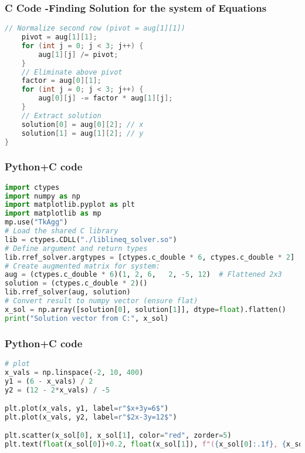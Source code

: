 \documentclass{beamer}
\begin{document}
\begin{frame}[fragile]
    \frametitle{C Code -Finding Solution for the system of Equations}

    \begin{lstlisting}[language=C]
    // Normalize second row (pivot = aug[1][1])
    pivot = aug[1][1];
    for (int j = 0; j < 3; j++) {
        aug[1][j] /= pivot;
    }
    // Eliminate above pivot
    factor = aug[0][1];
    for (int j = 0; j < 3; j++) {
        aug[0][j] -= factor * aug[1][j];
    }
    // Extract solution
    solution[0] = aug[0][2]; // x
    solution[1] = aug[1][2]; // y
}


    \end{lstlisting}
\end{frame}

\begin{frame}[fragile]
    \frametitle{Python+C code}

    \begin{lstlisting}[language=Python]
import ctypes
import numpy as np
import matplotlib.pyplot as plt
import matplotlib as mp
mp.use("TkAgg")
# Load the shared C library
lib = ctypes.CDLL("./liblineq_solver.so")
# Define argument and return types
lib.rref_solver.argtypes = [ctypes.c_double * 6, ctypes.c_double * 2]
# Create augmented matrix for system:
aug = (ctypes.c_double * 6)(1, 2, 6,   2, -5, 12)  # Flattened 2x3
solution = (ctypes.c_double * 2)()
lib.rref_solver(aug, solution)
# Convert result to numpy vector (ensure flat)
x_sol = np.array([solution[0], solution[1]], dtype=float).flatten()
print("Solution vector from C:", x_sol)


    \end{lstlisting}
\end{frame}

\begin{frame}[fragile]
    \frametitle{Python+C code}

    \begin{lstlisting}[language=Python]
# plot
x_vals = np.linspace(-2, 10, 400)
y1 = (6 - x_vals) / 2
y2 = (12 - 2*x_vals) / -5

plt.plot(x_vals, y1, label=r"$x+3y=6$")
plt.plot(x_vals, y2, label=r"$2x-3y=12$")

plt.scatter(x_sol[0], x_sol[1], color="red", zorder=5)
plt.text(float(x_sol[0])+0.2, float(x_sol[1]), f"({x_sol[0]:.1f}, {x_sol[1]:.1f})", color="red")


    \end{lstlisting}
\end{frame}
\end{document}
